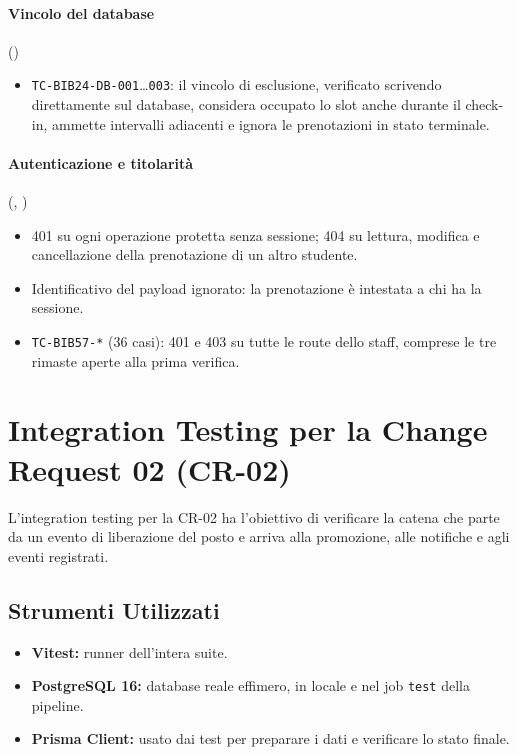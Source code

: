 \documentclass[11pt,a4paper,oneside,openany]{book}
\begin{document}
\paragraph{Vincolo del database}
()
\begin{itemize}
  \item \texttt{TC-BIB24-DB-001}\dots\texttt{003}: il vincolo di esclusione,
        verificato scrivendo direttamente sul database, considera occupato lo
        slot anche durante il check-in, ammette intervalli adiacenti e ignora
        le prenotazioni in stato terminale.
\end{itemize}

\paragraph{Autenticazione e titolarità}
(,
)
\begin{itemize}
  \item 401 su ogni operazione protetta senza sessione; 404 su lettura,
        modifica e cancellazione della prenotazione di un altro studente.
  \item Identificativo del payload ignorato: la prenotazione è intestata a
        chi ha la sessione.
  \item \texttt{TC-BIB57-*} (36 casi): 401 e 403 su tutte le route dello
        staff, comprese le tre rimaste aperte alla prima verifica.
\end{itemize}

\section{Integration Testing per la Change Request 02 (CR-02)}

L'integration testing per la CR-02 ha l'obiettivo di verificare la catena che
parte da un evento di liberazione del posto e arriva alla promozione, alle
notifiche e agli eventi registrati.

\subsection{Strumenti Utilizzati}

\begin{itemize}
  \item \textbf{Vitest:} runner dell'intera suite.
  \item \textbf{PostgreSQL 16:} database reale effimero, in locale e nel job
        \texttt{test} della pipeline.
  \item \textbf{Prisma Client:} usato dai test per preparare i dati e
        verificare lo stato finale.
\end{itemize}
\end{document}
